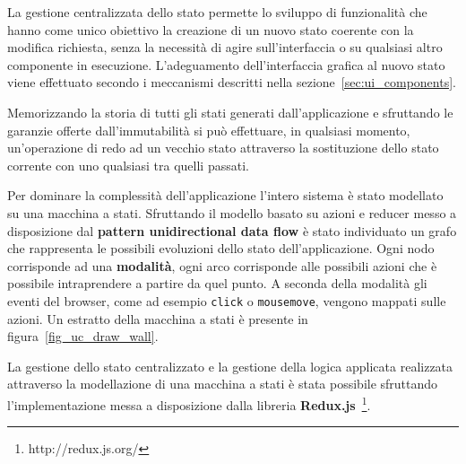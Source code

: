 La gestione centralizzata dello stato permette lo sviluppo di funzionalità che hanno come unico obiettivo la creazione di un nuovo stato coerente con la modifica richiesta, senza la necessità di agire sull'interfaccia o su qualsiasi altro componente in esecuzione. L'adeguamento dell'interfaccia grafica al nuovo stato viene effettuato secondo i meccanismi descritti nella sezione~\ref{sec:ui_components}.

Memorizzando la storia di tutti gli stati generati dall'applicazione e sfruttando le garanzie offerte dall'immutabilità si può effettuare, in qualsiasi momento, un'operazione di redo ad un vecchio stato attraverso la sostituzione dello stato corrente con uno qualsiasi tra quelli passati.

Per dominare la complessit\`a dell'applicazione l'intero sistema \`e stato modellato su una macchina a stati. Sfruttando il modello basato su azioni e reducer messo a disposizione dal \textbf{pattern unidirectional data flow} \`e stato individuato un grafo che rappresenta le possibili evoluzioni dello stato dell'applicazione. Ogni nodo corrisponde ad una \textbf{modalit\`a}, ogni arco corrisponde alle possibili azioni che è possibile intraprendere a partire da quel punto. A seconda della modalit\`a gli eventi del browser, come ad esempio \texttt{click} o \texttt{mousemove}, vengono mappati sulle azioni. Un estratto della macchina a stati \`e presente in figura~\ref{fig_uc_draw_wall}.

La gestione dello stato centralizzato e la gestione della logica applicata realizzata  attraverso la modellazione di una macchina a stati è stata possibile sfruttando l'implementazione messa a disposizione dalla libreria \textbf{Redux.js}~\footnote{http://redux.js.org/}.


